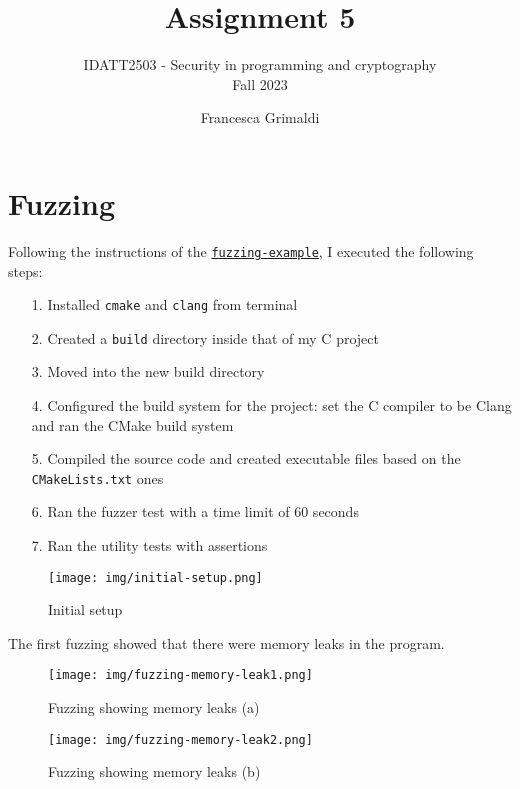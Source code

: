 \documentclass{article}
\title{%
    \huge Assignment 5}
\subtitle{%
    IDATT2503 - Security in programming and cryptography \\
    Fall 2023
    }
\author{%
  Francesca Grimaldi
}
\date{}
\begin{document}
\maketitle



\section{Fuzzing}
Following the instructions of the \href{https://gitlab.com/ntnu-tdat3020/fuzzing-example}{\texttt{fuzzing-example}}, I executed the following steps:
\begin{itemize}
    \item[1.]{Installed \texttt{cmake} and \texttt{clang} from terminal}
    \item[2.]{Created a \texttt{build} directory inside that of my C project}
    \item[3.]{Moved into the new build directory}
    \item[4.]{Configured the build system for the project: set the C compiler to be Clang and ran the CMake build system}
    \item[5.]{Compiled the source code and created executable files based on the \texttt{CMakeLists.txt} ones}
    \item[6.]{Ran the fuzzer test with a time limit of 60 seconds}
    \item[7.]{Ran the utility tests with assertions}
\end{itemize}

\begin{figure}[H]
    \centering
    \texttt{[image: img/initial-setup.png]}
    \caption{Initial setup}
    \label{fig:initial-setup}
\end{figure}

The first fuzzing showed that there were memory leaks in the program.

\begin{figure}[H]
    \centering
    \texttt{[image: img/fuzzing-memory-leak1.png]}
    \caption{Fuzzing showing memory leaks (a)}
    \label{fig:fuzzing-memory-leak1}
\end{figure}

\begin{figure}[H]
    \centering
    \texttt{[image: img/fuzzing-memory-leak2.png]}
    \caption{Fuzzing showing memory leaks (b)}
    \label{fig:fuzzing-memory-leak2}
\end{figure}
\end{document}
